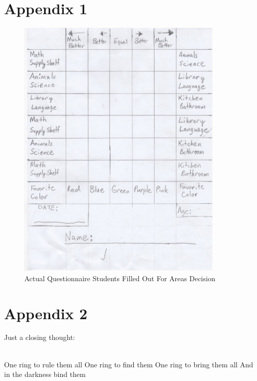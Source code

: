 \documentclass[11pt]{article}
\begin{document}



\section{Appendix 1}
\begin{figure}[!hb]
\caption{Actual Questionnaire Students Filled Out For Areas Decision}
\includegraphics[height=5in]{SampleAHPQuestionnaire}
\end{figure}

 \section{Appendix 2}
 Just a closing thought:

 \tengwarannataritalic[1.25]
 \Textendedcalma\TTthreedots\Tnuumen\Tessenuquerna\TTthreedots\Tungwe\Tando\Toore\TTrightcurl\Tumbar\Ttinco\TTthreedots\Tlambealt\TTrightcurl\Tquesse\TTdoublerightcurl
 \Tromanperiod\Ts
 \Textendedcalma\TTthreedots\Tnuumen\Tessenuquerna\TTthreedots\Tungwe\Tungwe\Tumbar\TTnasalizer\TTdot\Ttinco\TTthreedots\Tlambe\TTrightcurl
 \\
 \Textendedcalma\TTthreedots\Tnuumen\Tessenuquerna\TTthreedots\Tungwe\Tthuule\Troomen\Tquesse\TTthreedots\Ttinco\TTthreedots\Tlambealt\TTrightcurl\Tquesse\TTdoublerightcurl
 \Tromanperiod\Ts
 \Textendedungwe\TTthreedots\Tumbar\Toore\TTrightcurl\Tesse{}\Tmalta\TTrightcurl\Textendedcalma\TTdot\Ttelco\TTdot\Tquesse\Troomen\Tparma\TTnasalizer\TTdot\Ttinco\TTthreedots\Tlambe\TTrightcurl
 \newline
 One ring to rule them all \newline
 One ring to find them \newline
 One ring to bring them all \newline
 And in the darkness bind them

\end{document}
